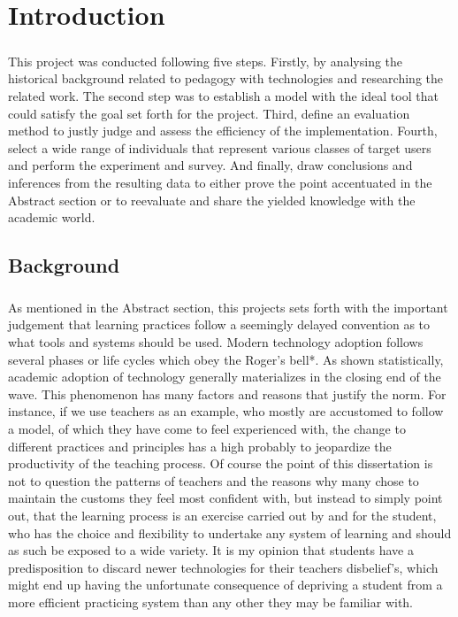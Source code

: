 \chapter{Introduction}
\label{cha:introduction}


\paragraph{}
This project was conducted following five steps. Firstly, by analysing the historical background related to pedagogy with technologies and researching the related work. The second step was to establish a model with the ideal tool that could satisfy the goal set forth for the project. Third, define an evaluation method to justly judge and assess the efficiency of the implementation. Fourth, select a wide range of individuals that represent various classes of target users and perform the experiment and survey. And finally, draw conclusions and inferences from the resulting data to either prove the point accentuated in the Abstract section or to reevaluate and share the yielded knowledge with the academic world.

\section{Background}
\paragraph{}
As mentioned in the Abstract section, this projects sets forth with the important judgement that learning practices follow a seemingly delayed convention as to what tools and systems should be used. Modern technology adoption follows several phases or life cycles which obey the Roger's bell*. As shown statistically, academic adoption of technology generally materializes in the closing end of the wave. This phenomenon has many factors and reasons that justify the norm. For instance, if we use teachers as an example, who mostly are accustomed to follow a model, of which they have come to feel experienced with, the change to different practices and principles has a high probably to jeopardize the productivity of the teaching process. Of course the point of this dissertation is not to question the patterns of teachers and the reasons why many chose to maintain the customs they feel most confident with, but instead to simply point out, that the learning process is an exercise carried out by and for the student, who has the choice and flexibility to undertake any system of learning and should as such be exposed to a wide variety. It is my opinion that students have a predisposition to discard newer technologies for their teachers disbelief's, which might end up having the unfortunate consequence of depriving a student from a more efficient practicing system than any other they may be familiar with.

